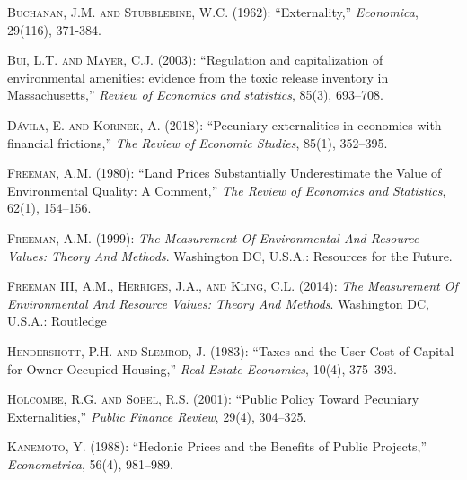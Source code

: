 \documentclass[ecta,nameyear,draft]{econsocart}
\theoremstyle{plain}
\theoremstyle{remark}
\begin{document}
\begin{thebibliography}{}
\textsc{Buchanan, J.M. and Stubblebine, W.C.} (1962):
``Externality,''
\textit{Economica}, 29(116), 371-384.
\endbibitem

\textsc{Bui, L.T. and Mayer, C.J.} (2003):
``Regulation and capitalization of environmental amenities: evidence from the toxic release inventory in Massachusetts,''
\textit{Review of Economics and statistics}, 85(3), 693--708.
\endbibitem

 
\textsc{Dávila, E. and Korinek, A.} (2018):
``Pecuniary externalities in economies with financial frictions,''
\textit{The Review of Economic Studies}, 85(1), 352--395.
\endbibitem


\textsc{Freeman, A.M.} (1980):
``Land Prices Substantially Underestimate the Value of Environmental Quality: A Comment,''
\textit{The Review of Economics and Statistics}, 62(1), 154--156.
\endbibitem


\textsc{Freeman, A.M.} (1999):
\textit{The Measurement Of Environmental And Resource Values: Theory And Methods}.
Washington DC, U.S.A.: Resources for the Future.
\endbibitem
 
\textsc{Freeman III, A.M., Herriges, J.A., and Kling, C.L.} (2014):
\textit{The Measurement Of Environmental And Resource Values: Theory And Methods}.
Washington DC, U.S.A.: Routledge
\endbibitem 

\textsc{Hendershott, P.H. and Slemrod, J.} (1983):
``Taxes and the User Cost of Capital for Owner-Occupied Housing,''
\textit{Real Estate Economics}, 10(4), 375--393.
\endbibitem

\textsc{Holcombe, R.G. and Sobel, R.S.} (2001):
``Public Policy Toward Pecuniary Externalities,''
\textit{Public Finance Review}, 29(4), 304--325.
\endbibitem

\textsc{Kanemoto, Y.} (1988):
``Hedonic Prices and the Benefits of Public Projects,''
\textit{Econometrica}, 56(4), 981--989.
\endbibitem




\end{thebibliography}
\end{document}
